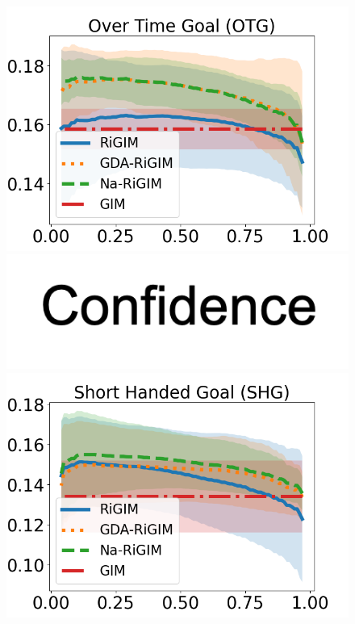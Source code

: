 \documentclass[letterpaper]{article} %
\begin{document}
\begin{figure}[htbp]
\begin{minipage}{0.16\textwidth}
    \includegraphics[scale=0.16]{figures/risk_curve_OTG_shadow.png}\par
    \vspace{-0.05in}
    \includegraphics[scale=0.12]{figures/confidence_x_label.png}
    \end{minipage}
    \begin{minipage}{0.16\textwidth}
    \centering
    \includegraphics[scale=0.16]{figures/risk_curve_SHG_shadow.png}\par

\end{minipage}
\end{figure}
\end{document}
